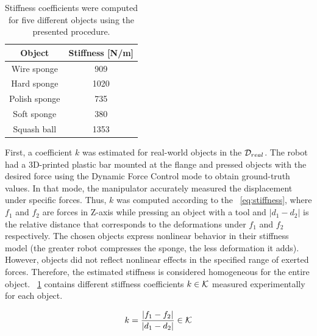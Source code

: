 \documentclass[a4paper, 10pt, twoside]{report}
\begin{document}
\begin{table}[htbp!]
\centering
\caption{Stiffness coefficients were computed for five different objects using the presented procedure.}
\begin{tabular}{cc}
\hline
\textbf{Object} & \textbf{Stiffness {[}N/m{]}} \\ \hline
Wire sponge     & 909                  \\
Hard sponge     & 1020                  \\ 
Polish sponge   & 735                  \\ 
Soft sponge     & 380                  \\ 
Squash ball     & 1353                  \\ \hline
\end{tabular}
\label{tab:objects}
\end{table}

First, a coefficient $k$ was estimated for real-world objects in the ${\cal D}_{real}$. The robot had a 3D-printed plastic bar mounted at the flange and pressed objects with the desired force using the Dynamic Force Control mode to obtain ground-truth values. In that mode, the manipulator accurately measured the displacement under specific forces. Thus, $k$ was computed according to the \Equation~\ref{eq:stiffness}, where $f_1$ and $f_2$ are forces in Z-axis while pressing an object with a tool and $\lvert d_1 - d_2\rvert$ is the relative distance that corresponds to the deformations under $f_1$ and $f_2$ respectively. The chosen objects express nonlinear behavior in their stiffness model (\eg the greater robot compresses the sponge, the less deformation it adds). However, objects did not reflect nonlinear effects in the specified range of exerted forces. Therefore, the estimated stiffness is considered homogeneous for the entire object. \Table~\ref{tab:objects} contains different stiffness coefficients $k \in {\cal K}$ measured experimentally for each object.

\begin{equation}
    \label{eq:stiffness}
    k = \frac{\lvert f_1 - f_2 \rvert}{\lvert d_1 - d_2\rvert} \in {\cal K}
\end{equation}
\end{document}
